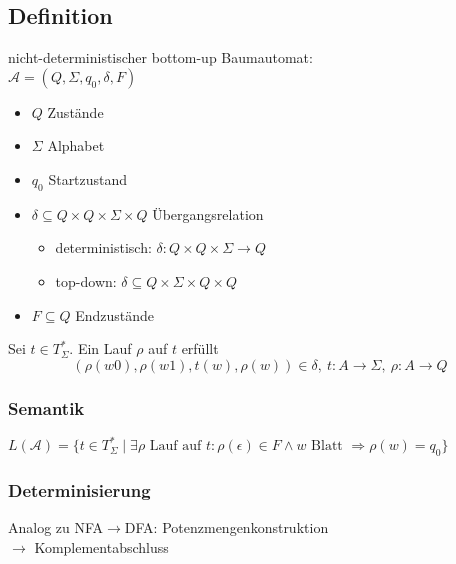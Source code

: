     \subsection{Definition}
        nicht-deterministischer bottom-up Baumautomat:\\
        $\mathcal{A}=(Q,\Sigma,q_0,\delta,F)$
        \begin{itemize}
            \item $Q$ Zustände
            \item $\Sigma$ Alphabet
            \item $q_0$ Startzustand
            \item $\delta\subseteq Q\times Q\times \Sigma\times Q$ Übergangsrelation
            \begin{itemize}
                \item deterministisch: $\delta: Q\times Q\times \Sigma\rightarrow Q$
                \item top-down: $\delta\subseteq Q\times\Sigma\times Q\times Q$
            \end{itemize}
            \item $F\subseteq Q$ Endzustände
        \end{itemize}
        Sei $t\in T_\Sigma^*$. Ein Lauf $\rho$ auf $t$ erfüllt $$\left(\rho(w0),\rho(w1),t(w),\rho(w)\right)\in\delta,\ t: A\rightarrow\Sigma,\ \rho:A\rightarrow Q$$
        \subsubsection{Semantik}
            $L(\mathcal{A})=\{t\in T_\Sigma^*\mid\exists\rho\text{ Lauf auf }t:\rho(\epsilon)\in F\wedge w\text{ Blatt }\Rightarrow \rho(w)=q_0\}$
        \subsubsection{Determinisierung}
            Analog zu NFA$\rightarrow$DFA: Potenzmengenkonstruktion\\
            $\rightarrow$ Komplementabschluss

